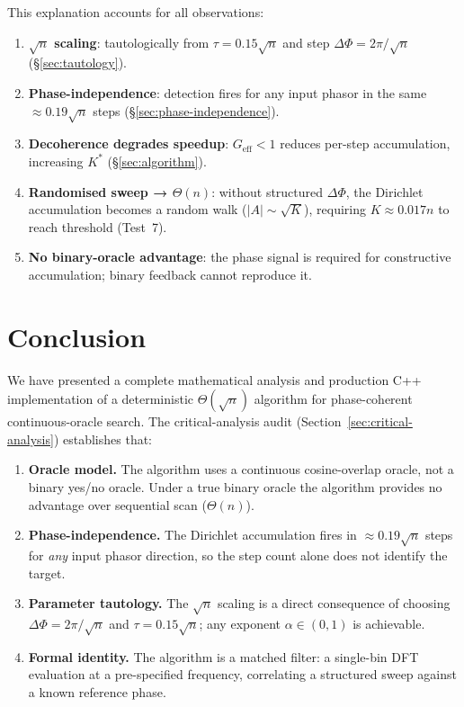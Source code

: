 \documentclass[12pt,a4paper]{article}
\theoremstyle{plain}
\theoremstyle{definition}
\theoremstyle{remark}
\begin{document}
This explanation accounts for all observations:
\begin{enumerate}
  \item \textbf{$\sqrt{n}$ scaling}: tautologically from $\tau = 0.15\sqrt{n}$
    and step $\Delta\Phi = 2\pi/\sqrt{n}$ (\S\ref{sec:tautology}).
  \item \textbf{Phase-independence}: detection fires for any input phasor in
    the same $\approx 0.19\sqrt{n}$ steps (\S\ref{sec:phase-independence}).
  \item \textbf{Decoherence degrades speedup}: $G_\mathrm{eff} < 1$ reduces
    per-step accumulation, increasing $K^*$ (\S\ref{sec:algorithm}).
  \item \textbf{Randomised sweep → $\Theta(n)$}: without structured $\Delta\Phi$,
    the Dirichlet accumulation becomes a random walk
    ($|A| \sim \sqrt{K}$), requiring $K \approx 0.017n$ to reach threshold
    (Test~7).
  \item \textbf{No binary-oracle advantage}: the phase signal is required for
    constructive accumulation; binary feedback cannot reproduce it.
\end{enumerate}

\section{Conclusion}
\label{sec:conclusion}

We have presented a complete mathematical analysis and production C++
implementation of a deterministic $\Theta(\sqrt{n})$ algorithm for
phase-coherent continuous-oracle search.  The critical-analysis audit
(Section~\ref{sec:critical-analysis}) establishes that:

\begin{enumerate}
  \item \textbf{Oracle model.}  The algorithm uses a continuous cosine-overlap
    oracle, not a binary yes/no oracle.  Under a true binary oracle the
    algorithm provides no advantage over sequential scan ($\Theta(n)$).
  \item \textbf{Phase-independence.}  The Dirichlet accumulation fires in
    $\approx 0.19\sqrt{n}$ steps for \emph{any} input phasor direction,
    so the step count alone does not identify the target.
  \item \textbf{Parameter tautology.}  The $\sqrt{n}$ scaling is a direct
    consequence of choosing $\Delta\Phi = 2\pi/\sqrt{n}$ and
    $\tau = 0.15\sqrt{n}$; any exponent $\alpha \in (0,1)$ is achievable.
  \item \textbf{Formal identity.}  The algorithm is a matched filter:
    a single-bin DFT evaluation at a pre-specified frequency, correlating
    a structured sweep against a known reference phase.
\end{enumerate}
\end{document}
